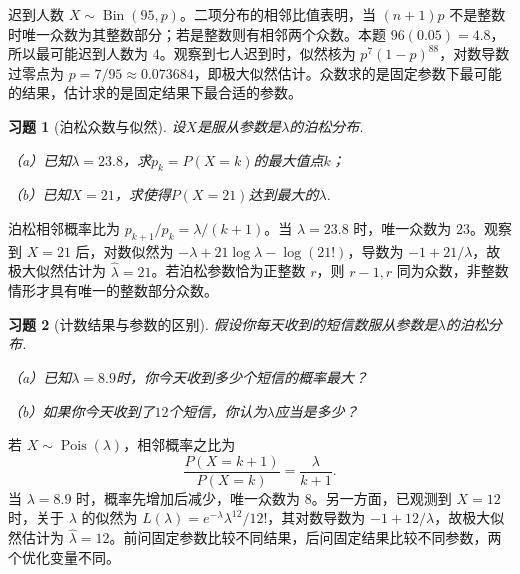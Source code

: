 \documentclass[12pt,fontset=fandol]{ctexart}
\newtheorem{exercise}{习题}[section]
\begin{document}
\begin{solve}\label{a:Y3.22}迟到人数 $X\sim\operatorname{Bin}(95,p)$。二项分布的相邻比值表明，当 $(n+1)p$ 不是整数时唯一众数为其整数部分；若是整数则有相邻两个众数。本题 $96(0.05)=4.8$，所以最可能迟到人数为 $4$。观察到七人迟到时，似然核为 $p^7(1-p)^{88}$，对数导数过零点为 $p=7/95\approx0.073684$，即极大似然估计。众数求的是固定参数下最可能的结果，估计求的是固定结果下最合适的参数。\end{solve}

\begin{exercise}[泊松众数与似然]\label{q:Y3.23}
设$X$是服从参数是$\lambda$的泊松分布.

（a）已知$\lambda=23.8$，求$p_k=P(X=k)$的最大值点$k$；

（b）已知$X=21$，求使得$P(X=21)$达到最大的$\lambda$.\par{}
\end{exercise}

\begin{solve}\label{a:Y3.23}泊松相邻概率比为 $p_{k+1}/p_k=\lambda/(k+1)$。当 $\lambda=23.8$ 时，唯一众数为 $23$。观察到 $X=21$ 后，对数似然为 $-\lambda+21\log\lambda-\log(21!)$，导数为 $-1+21/\lambda$，故极大似然估计为 $\widehat\lambda=21$。若泊松参数恰为正整数 $r$，则 $r-1,r$ 同为众数，非整数情形才具有唯一的整数部分众数。\end{solve}

\begin{exercise}[计数结果与参数的区别]\label{q:Y3.24}
假设你每天收到的短信数服从参数是$\lambda$的泊松分布.

（a）已知$\lambda=8.9$时，你今天收到多少个短信的概率最大？

（b）如果你今天收到了$12$个短信，你认为$\lambda$应当是多少？\par{}
\end{exercise}

\begin{solve}\label{a:Y3.24}若 $X\sim\operatorname{Pois}(\lambda)$，相邻概率之比为\[\frac{P(X=k+1)}{P(X=k)}=\frac{\lambda}{k+1}.\]当 $\lambda=8.9$ 时，概率先增加后减少，唯一众数为 $8$。另一方面，已观测到 $X=12$ 时，关于 $\lambda$ 的似然为 $L(\lambda)=e^{-\lambda}\lambda^{12}/12!$，其对数导数为 $-1+12/\lambda$，故极大似然估计为 $\widehat\lambda=12$。前问固定参数比较不同结果，后问固定结果比较不同参数，两个优化变量不同。\end{solve}
\end{document}
